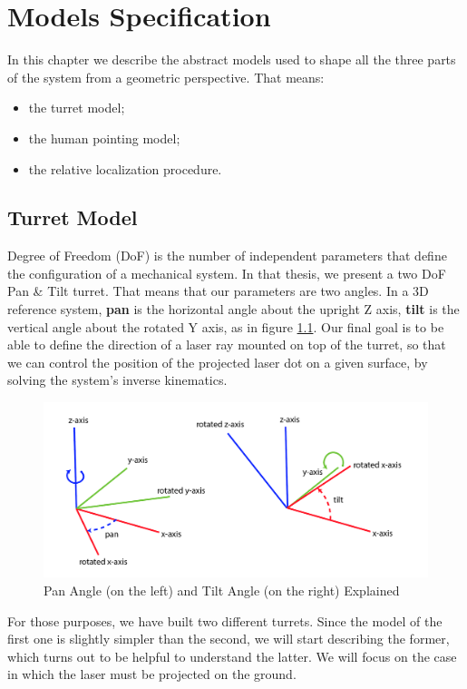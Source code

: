 \chapter{Models Specification}
\label{chap:1} 
In this chapter we describe the abstract models used to shape all the three parts of the system from a geometric perspective. That means:
\begin{itemize}
    \item the turret model;
    \item the human pointing model;
    \item the relative localization procedure.
\end{itemize}
\section{Turret Model}
\label{sec:1.1}
Degree of Freedom (DoF) is the number of independent parameters that define the configuration of a mechanical system. In that thesis, we present a two DoF Pan \& Tilt turret. That means that our parameters are two angles. In a 3D reference system, \textbf{pan} is the horizontal angle about the upright Z axis, \textbf{tilt} is the vertical angle about the rotated Y axis, as in figure \ref{fig:panTilt}.
Our final goal is to be able to define the direction of a laser ray mounted on top of the turret, so that we can control the position of the projected laser dot on a given surface, by solving the system's inverse kinematics.\\
\begin{figure}
	\centering
	\includegraphics[width=\textwidth]{img/panTilt.png}%
	\caption{Pan Angle (on the left) and Tilt Angle (on the right) Explained}
	\label{fig:panTilt}
\end{figure}
For those purposes, we have built two different turrets. Since the model of the first one is slightly simpler than the second, we will start describing the former, which turns out to be helpful to understand the latter. We will focus on the case in which the laser must be projected on the ground.

